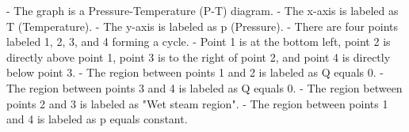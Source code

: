 - The graph is a Pressure-Temperature (P-T) diagram.
- The x-axis is labeled as T (Temperature).
- The y-axis is labeled as p (Pressure).
- There are four points labeled 1, 2, 3, and 4 forming a cycle.
- Point 1 is at the bottom left, point 2 is directly above point 1, point 3 is to the right of point 2, and point 4 is directly below point 3.
- The region between points 1 and 2 is labeled as Q equals 0.
- The region between points 3 and 4 is labeled as Q equals 0.
- The region between points 2 and 3 is labeled as "Wet steam region".
- The region between points 1 and 4 is labeled as p equals constant.